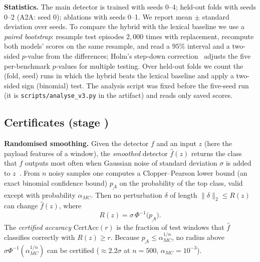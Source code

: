 \documentclass[conference,compsoc]{IEEEtran}
\begin{document}
\textbf{Statistics.} The main detector is trained with seeds 0--4; held-out folds with seeds 0--2 (A2A: seed 0); ablations with seeds 0--1. We report mean $\pm$ standard deviation over seeds. To compare the hybrid with the lexical baseline we use a \emph{paired bootstrap}: resample test episodes $2{,}000$ times with replacement, recompute both models' scores on the same resample, and read a $95\%$ interval and a two-sided $p$-value from the differences; Holm's step-down correction~\cite{Holm1979} adjusts the five per-benchmark $p$-values for multiple testing. Over held-out folds we count the (fold, seed) runs in which the hybrid beats the lexical baseline and apply a two-sided sign (binomial) test. The analysis script was fixed before the five-seed run (it is \texttt{scripts/analyse\_v3.py} in the artifact) and reads only saved scores.

\subsection{Certificates (stage )}
\label{sec:certs}
\textbf{Randomised smoothing.} Given the detector $f$ and an input $z$ (here the payload features of a window), the \emph{smoothed} detector $\hat f(z)$ returns the class that $f$ outputs most often when Gaussian noise of standard deviation $\sigma$ is added to $z$~\cite{Cohen2019RandSmooth}. From $n$ noisy samples one computes a Clopper--Pearson lower bound (an exact binomial confidence bound) $\underline{p_{A}}$ on the probability of the top class, valid except with probability $\alpha_{MC}$. Then no perturbation $\delta$ of length $\lVert\delta\rVert_{2}\le R(z)$ can change $\hat f(z)$, where
\begin{equation}
R(z)=\sigma\,\Phi^{-1}\bigl(\underline{p_{A}}\bigr).
\label{eq:cert-radius}
\end{equation}
The \emph{certified accuracy} $\mathrm{CertAcc}(r)$ is the fraction of test windows that $\hat f$ classifies correctly with $R(z)\ge r$. Because $\underline{p_{A}}\le\alpha_{MC}^{1/n}$, no radius above $\sigma\Phi^{-1}(\alpha_{MC}^{1/n})$ can be certified ($\approx2.2\sigma$ at $n=500$, $\alpha_{MC}=10^{-3}$).
\end{document}
